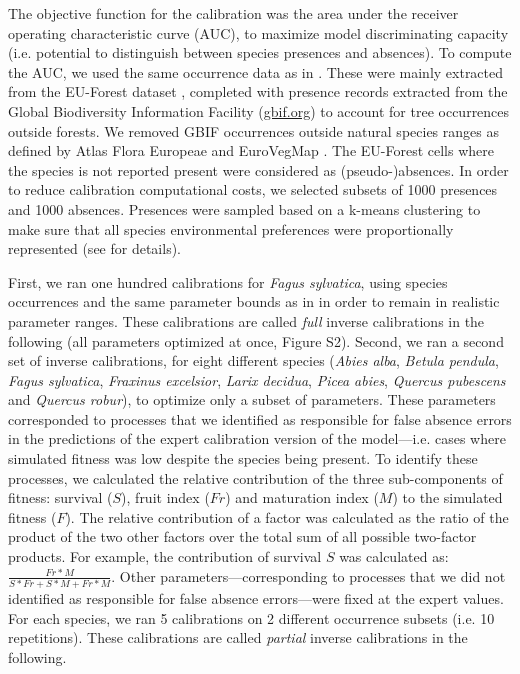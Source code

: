 \documentclass[letterpaper,8pt]{extarticle}  %
\begin{document}
\begin{doublespacing}
\begin{linenumbers}
The objective function for the calibration was the area under the receiver operating characteristic curve (AUC), to maximize model discriminating capacity (i.e. potential to distinguish between species presences and absences). To compute the AUC, we used the same occurrence data as in \citet{VanderMeersch2023}. These were mainly extracted from the EU-Forest dataset \citep{Mauri2017}, completed with presence records extracted from the Global Biodiversity Information Facility (\url{gbif.org}) to account for tree occurrences outside forests. We removed GBIF occurrences outside natural species ranges as defined by Atlas Flora Europeae \citep{AFE2005} and EuroVegMap \citep{EVM2003}. The EU-Forest cells where the species is not reported present were considered as (pseudo-)absences. In order to reduce calibration computational costs, we selected subsets of 1000 presences and 1000 absences. Presences were sampled based on a k-means clustering to make sure that all species environmental preferences were proportionally represented (see \citet{VanderMeersch2023} for details). 

First, we ran one hundred calibrations for \emph{Fagus sylvatica}, using species occurrences and the same parameter bounds as in \citet{VanderMeersch2023} in order to remain in realistic parameter ranges. These calibrations are called \emph{full} inverse calibrations in the following (all parameters optimized at once, Figure S2). Second, we ran a second set of inverse calibrations, for eight different species (\emph{Abies alba}, \emph{Betula pendula}, \emph{Fagus sylvatica}, \emph{Fraxinus excelsior}, \emph{Larix decidua}, \emph{Picea abies}, \emph{Quercus pubescens} and \emph{Quercus robur}), to optimize only a subset of parameters. These parameters corresponded to processes that we identified as responsible for false absence errors in the predictions of the expert calibration version of the model---i.e. cases where simulated fitness was low despite the species being present. To identify these processes, we calculated the relative contribution of the three sub-components of fitness: survival ($S$), fruit index ($Fr$) and maturation index ($M$) to the simulated fitness ($F$). The relative contribution of a factor was calculated as the ratio of the product of the two other factors over the total sum of all possible two-factor products. For example, the contribution of survival $S$ was calculated as: $\frac{Fr*M}{S*Fr+S*M+Fr*M}$. Other parameters---corresponding to processes that we did not identified as responsible for false absence errors---were fixed at the expert values. For each species, we ran 5 calibrations on 2 different occurrence subsets (i.e. 10 repetitions). These calibrations are called \emph{partial} inverse calibrations in the following. 


\end{linenumbers}
\end{doublespacing}
\end{document}
